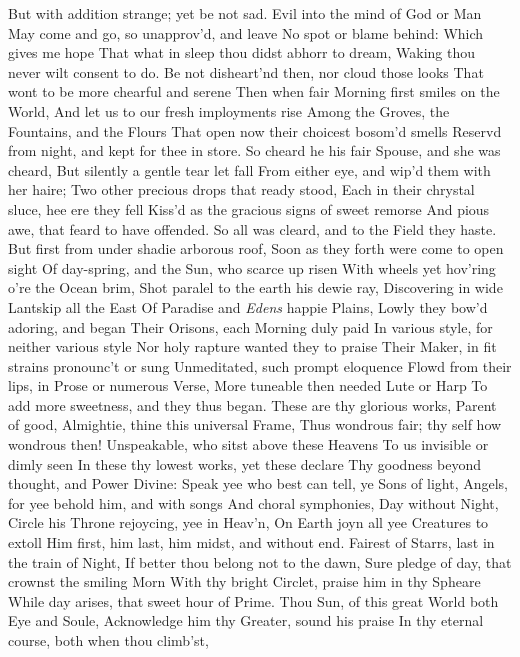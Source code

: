 \documentclass[11pt]{book}
\newcounter {first}
\newcounter {last}
\begin{document}
But with addition strange; yet be not sad. 
Evil into the mind of God or Man 
May come and go, so unapprov'd, and leave 
No spot or blame behind: Which gives me hope 
That what in sleep thou didst abhorr to dream, 
Waking thou never wilt consent to do. 
Be not disheart'nd then, nor cloud those looks 
That wont to be more chearful and serene 
Then when fair Morning first smiles on the World, 
And let us to our fresh imployments rise 
Among the Groves, the Fountains, and the Flours 
That open now their choicest bosom'd smells 
Reservd from night, and kept for thee in store. 
\quad So cheard he his fair Spouse, and she was cheard, 
But silently a gentle tear let fall 
From either eye, and wip'd them with her haire; 
Two other precious drops that ready stood, 
Each in their chrystal sluce, hee ere they fell 
Kiss'd as the gracious signs of sweet remorse 
And pious awe, that feard to have offended. 
\quad So all was cleard, and to the Field they haste. 
But first from under shadie arborous roof, 
Soon as they forth were come to open sight 
Of day-spring, and the Sun, who scarce up risen 
With wheels yet hov'ring o're the Ocean brim, 
Shot paralel to the earth his dewie ray, 
Discovering in wide Lantskip all the East 
Of Paradise and \textit{Edens} happie Plains, 
Lowly they bow'd adoring, and began 
Their Orisons, each Morning duly paid 
In various style, for neither various style 
Nor holy rapture wanted they to praise 
Their Maker, in fit strains pronounc't or sung 
Unmeditated, such prompt eloquence 
Flowd from their lips, in Prose or numerous Verse, 
More tuneable then needed Lute or Harp 
To add more sweetness, and they thus began. 
\quad These are thy glorious works, Parent of good, 
Almightie, thine this universal Frame, 
Thus wondrous fair; thy self how wondrous then! 
Unspeakable, who sitst above these Heavens 
To us invisible or dimly seen 
In these thy lowest works, yet these declare 
Thy goodness beyond thought, and Power Divine: 
Speak yee who best can tell, ye Sons of light, 
Angels, for yee behold him, and with songs 
And choral symphonies, Day without Night, 
Circle his Throne rejoycing, yee in Heav'n, 
On Earth joyn all yee Creatures to extoll 
Him first, him last, him midst, and without end. 
Fairest of Starrs, last in the train of Night, 
If better thou belong not to the dawn, 
Sure pledge of day, that crownst the smiling Morn 
With thy bright Circlet, praise him in thy Spheare 
While day arises, that sweet hour of Prime. 
Thou Sun, of this great World both Eye and Soule, 
Acknowledge him thy Greater, sound his praise 
In thy eternal course, both when thou climb'st, 
\end{document}
